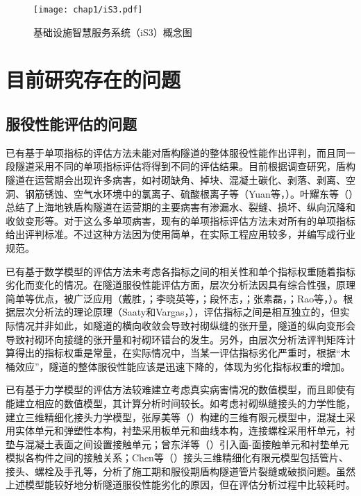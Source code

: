 \begin{figure}[!h]
	\centering
	\texttt{[image: chap1/iS3.pdf]}
	\caption{基础设施智慧服务系统（iS3）概念图}
	\label{fig:iS3概念图}
\end{figure}

\section{目前研究存在的问题}

\subsection{服役性能评估的问题}

已有基于单项指标的评估方法未能对盾构隧道的整体服役性能作出评判，而且同一段隧道采用不同的单项指标评估将得到不同的评估结果。目前根据调查研究，盾构隧道在运营期会出现许多病害，如衬砌缺角、掉块、混凝土碳化、剥落、剥离、空洞、钢筋锈蚀、空气水环境中的氯离子、硫酸根离子等（Yuan等，\citeyear{yuan2013predictive}）。叶耀东等（\citeyear{叶耀东2007软土地铁运营隧道病害现状及成因分析}）总结了上海地铁盾构隧道在运营期的主要病害有渗漏水、裂缝、损坏、纵向沉降和收敛变形等。对于这么多单项病害，现有的单项指标评估方法未对所有的单项指标给出评判标准。不过这种方法因为使用简单，在实际工程应用较多，并编写成行业规范。

已有基于数学模型的评估方法未考虑各指标之间的相关性和单个指标权重随着指标劣化而变化的情况。在隧道服役性能评估方面，层次分析法因具有综合性强，原理简单等优点，被广泛应用（戴胜，\citeyear{戴胜2008越江盾构隧道耐久性分析与评估体系研究}；李晓英等，\citeyear{李晓英2008铁路隧道健康状态模糊评价体系研究}；段怀志，\citeyear{段怀志2009隧道及地下工程健康评估研究}；张素磊，\citeyear{张素磊2012隧道衬砌结构健康诊断及技术状况评定研究}；Rao等，\citeyear{rao2016fuzzy}）。根据层次分析法的理论原理（Saaty和Vargas，\citeyear{saaty2012models}），评估指标之间是相互独立的，但实际情况并非如此，如隧道的横向收敛会导致衬砌纵缝的张开量，隧道的纵向变形会导致衬砌环向接缝的张开量和衬砌环错台的发生。另外，由层次分析法评判矩阵计算得出的指标权重是常量，在实际情况中，当某一评估指标劣化严重时，根据“木桶效应”，隧道的整体服役性能应该是迅速下降的，体现为劣化指标权重的增加。

已有基于力学模型的评估方法较难建立考虑真实病害情况的数值模型，而且即使有能建立相应的数值模型，其计算分析时间较长。如考虑衬砌纵缝接头的力学性能，建立三维精细化接头力学模型，张厚美等（\citeyear{张厚美2000圆形隧道装配式衬砌接头刚度模型研究}）构建的三维有限元模型中，混凝土采用实体单元和弹塑性本构，衬垫采用板单元和曲线本构，连接螺栓采用杆单元，衬垫与混凝土表面之间设置接触单元；曾东洋等（\citeyear{曾东洋2005地铁盾构隧道管片接头刚度影响因素研究}）引入面-面接触单元和衬垫单元模拟各构件之间的接触关系；Chen等（\citeyear{chen2009numerical}）接头三维精细化有限元模型包括管片、接头、螺栓及手孔等，分析了施工期和服役期盾构隧道管片裂缝或破损问题。虽然上述模型能较好地分析隧道服役性能劣化的原因，但在评估分析过程中比较耗时。

